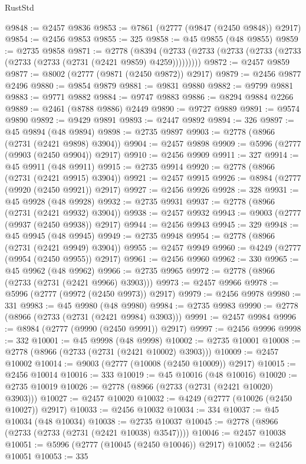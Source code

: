 \begin{lexlean}{RustStd}
\begin{coremodule}
@9848 := @2457 @9836
@9853 := @7861 (@2777 (@9847 (@2450 @9848)) @2917)
@9854 := @2456 @9853
@9855 := 325
@9858 := @45 @9855 (@48 @9855)
@9859 := @2735 @9858
@9871 := @2778
    (@8394 (@2733 (@2733 (@2733 (@2733 (@2733 (@2733 (@2733 (@2731 (@2421 @9859) @4259)))))))))
@9872 := @2457 @9859
@9877 := @8002 (@2777 (@9871 (@2450 @9872)) @2917)
@9879 := @2456 @9877 @2496
@9880 := @9854 @9879
@9881 := @9831 @9880
@9882 := @9799 @9881
@9883 := @9771 @9882
@9884 := @9747 @9883
@9886 := @8294 @9884 @2266
@9889 := @2461 (@8788 @9886) @2449
@9890 := @9727 @9889
@9891 := @9574 @9890
@9892 := @9429 @9891
@9893 := @2447 @9892
@9894 := 326
@9897 := @45 @9894 (@48 @9894)
@9898 := @2735 @9897
@9903 := @2778 (@8966 (@2731 (@2421 @9898) @3904))
@9904 := @2457 @9898
@9909 := @5996 (@2777 (@9903 (@2450 @9904)) @2917)
@9910 := @2456 @9909
@9911 := 327
@9914 := @45 @9911 (@48 @9911)
@9915 := @2735 @9914
@9920 := @2778 (@8966 (@2731 (@2421 @9915) @3904))
@9921 := @2457 @9915
@9926 := @8984 (@2777 (@9920 (@2450 @9921)) @2917)
@9927 := @2456 @9926
@9928 := 328
@9931 := @45 @9928 (@48 @9928)
@9932 := @2735 @9931
@9937 := @2778 (@8966 (@2731 (@2421 @9932) @3904))
@9938 := @2457 @9932
@9943 := @9003 (@2777 (@9937 (@2450 @9938)) @2917)
@9944 := @2456 @9943
@9945 := 329
@9948 := @45 @9945 (@48 @9945)
@9949 := @2735 @9948
@9954 := @2778 (@8966 (@2731 (@2421 @9949) @3904))
@9955 := @2457 @9949
@9960 := @4249 (@2777 (@9954 (@2450 @9955)) @2917)
@9961 := @2456 @9960
@9962 := 330
@9965 := @45 @9962 (@48 @9962)
@9966 := @2735 @9965
@9972 := @2778 (@8966 (@2733 (@2731 (@2421 @9966) @3903)))
@9973 := @2457 @9966
@9978 := @5996 (@2777 (@9972 (@2450 @9973)) @2917)
@9979 := @2456 @9978
@9980 := 331
@9983 := @45 @9980 (@48 @9980)
@9984 := @2735 @9983
@9990 := @2778 (@8966 (@2733 (@2731 (@2421 @9984) @3903)))
@9991 := @2457 @9984
@9996 := @8984 (@2777 (@9990 (@2450 @9991)) @2917)
@9997 := @2456 @9996
@9998 := 332
@10001 := @45 @9998 (@48 @9998)
@10002 := @2735 @10001
@10008 := @2778 (@8966 (@2733 (@2731 (@2421 @10002) @3903)))
@10009 := @2457 @10002
@10014 := @9003 (@2777 (@10008 (@2450 @10009)) @2917)
@10015 := @2456 @10014
@10016 := 333
@10019 := @45 @10016 (@48 @10016)
@10020 := @2735 @10019
@10026 := @2778 (@8966 (@2733 (@2731 (@2421 @10020) @3903)))
@10027 := @2457 @10020
@10032 := @4249 (@2777 (@10026 (@2450 @10027)) @2917)
@10033 := @2456 @10032
@10034 := 334
@10037 := @45 @10034 (@48 @10034)
@10038 := @2735 @10037
@10045 := @2778 (@8966 (@2733 (@2733 (@2731 (@2421 @10038) @3547))))
@10046 := @2457 @10038
@10051 := @5996 (@2777 (@10045 (@2450 @10046)) @2917)
@10052 := @2456 @10051
@10053 := 335

\end{coremodule}
\end{lexlean}
